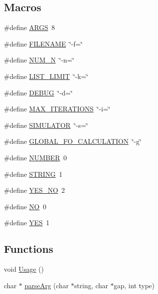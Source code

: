 \subsection*{Macros}
\begin{DoxyCompactItemize}
\item 
\#define \hyperlink{optjrParam__helper_8hh_aff1b09d6630c6c0942f78171e74c1b9d}{A\-R\-G\-S}~8
\item 
\#define \hyperlink{optjrParam__helper_8hh_a8de29f7c8bbf1a81cc6e71ac602032d3}{F\-I\-L\-E\-N\-A\-M\-E}~\char`\"{}-\/f=\char`\"{}
\item 
\#define \hyperlink{optjrParam__helper_8hh_a4f7be859c7225cea6daef529ce8b737a}{N\-U\-M\-\_\-\-N}~\char`\"{}-\/n=\char`\"{}
\item 
\#define \hyperlink{optjrParam__helper_8hh_aaf0b4413f90241f1be4ff1235595706f}{L\-I\-S\-T\-\_\-\-L\-I\-M\-I\-T}~\char`\"{}-\/k=\char`\"{}
\item 
\#define \hyperlink{optjrParam__helper_8hh_ad72dbcf6d0153db1b8d8a58001feed83}{D\-E\-B\-U\-G}~\char`\"{}-\/d=\char`\"{}
\item 
\#define \hyperlink{optjrParam__helper_8hh_a0a3abbca80bc98e7abcb3ae73abe0f14}{M\-A\-X\-\_\-\-I\-T\-E\-R\-A\-T\-I\-O\-N\-S}~\char`\"{}-\/i=\char`\"{}
\item 
\#define \hyperlink{optjrParam__helper_8hh_ad8a5d8c4e3342fb668142df792e93f38}{S\-I\-M\-U\-L\-A\-T\-O\-R}~\char`\"{}-\/s=\char`\"{}
\item 
\#define \hyperlink{optjrParam__helper_8hh_a48549690ff4f612c62edddb87aacc438}{G\-L\-O\-B\-A\-L\-\_\-\-F\-O\-\_\-\-C\-A\-L\-C\-U\-L\-A\-T\-I\-O\-N}~\char`\"{}-\/g\char`\"{}
\item 
\#define \hyperlink{optjrParam__helper_8hh_abc544a4ed22112e62773c113652c5063}{N\-U\-M\-B\-E\-R}~0
\item 
\#define \hyperlink{optjrParam__helper_8hh_a0f4d394a3ab4e09bff60f714c66dc5ee}{S\-T\-R\-I\-N\-G}~1
\item 
\#define \hyperlink{optjrParam__helper_8hh_a0966d7215d44b0eb30c4082965114e45}{Y\-E\-S\-\_\-\-N\-O}~2
\item 
\#define \hyperlink{optjrParam__helper_8hh_a996bde01ecac342918f0a2c4e7ce7bd5}{N\-O}~0
\item 
\#define \hyperlink{optjrParam__helper_8hh_a7ebc9a785e5ab85457c98595aac81589}{Y\-E\-S}~1
\end{DoxyCompactItemize}
\subsection*{Functions}
\begin{DoxyCompactItemize}
\item 
void \hyperlink{optjrParam__helper_8hh_a5ae07f63d6b390e42068d941038dadf2}{Usage} ()
\item 
char $\ast$ \hyperlink{optjrParam__helper_8hh_a7f9e2be22b56862eb593a40550cff1dc}{parse\-Arg} (char $\ast$string, char $\ast$gap, int type)
\end{DoxyCompactItemize}



